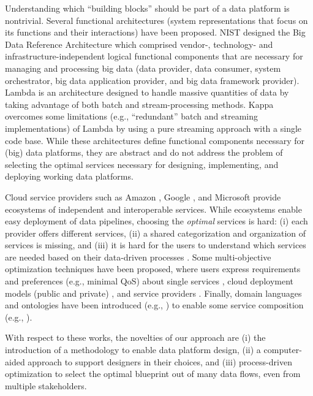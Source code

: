 Understanding which ``building blocks'' should be part of a data platform is nontrivial. Several functional architectures (system representations that focus on its functions and their interactions) have been proposed. NIST designed the Big Data Reference Architecture \cite{chang2019nist} which comprised vendor-, technology- and infrastructure-independent logical functional components that are necessary for managing and processing big data (data provider, data consumer, system orchestrator, big data application provider, and big data framework provider). Lambda \cite{DBLP:conf/bigdataconf/KiranMMDB15} is an architecture designed to handle massive quantities of data by taking advantage of both batch and stream-processing methods. Kappa \cite{kreps2014questioning} overcomes some limitations (e.g., ``redundant'' batch and streaming implementations) of Lambda by using a pure streaming approach with a single code base. While these architectures define functional components necessary for (big) data platforms, they are abstract and do not address the problem of selecting the optimal services necessary for designing, implementing, and deploying working data platforms.

Cloud service providers such as Amazon \cite{aws}, Google \cite{gcp}, and Microsoft \cite{azure} provide ecosystems of independent and interoperable services. While ecosystems enable easy deployment of data pipelines, choosing the \textit{optimal} services is hard: (i) each provider offers different services, (ii) a shared categorization and organization of services is missing, and (iii) it is hard for the users to understand which services are needed based on their data-driven processes \cite{DBLP:journals/jnca/SunDHHC14}. Some multi-objective optimization techniques have been proposed, where users express requirements and preferences (e.g., minimal QoS) about single services \cite{DBLP:conf/ncca/CavalcanteLBCDP11,DBLP:journals/cluster/NejatMVB22,DBLP:journals/jss/LuY18}, cloud deployment models (public and private) \cite{DBLP:journals/tcc/Garg22}, and service providers \cite{DBLP:journals/eswa/KarKPK23,DBLP:journals/cluster/TomarKG23}. Finally, domain languages and ontologies have been introduced (e.g., \cite{DBLP:conf/webi/NouraG19}) to enable some service composition (e.g., \cite{DBLP:journals/jsan/MahfoudhCS21}).

With respect to these works, the novelties of our approach are (i) the introduction of a methodology to enable data platform design, (ii) a computer-aided approach to support designers in their choices, and (iii) process-driven optimization to select the optimal blueprint out of many data flows, even from multiple stakeholders.

